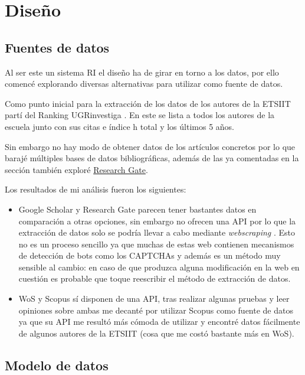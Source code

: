 \chapter{Diseño}


\section{Fuentes de datos}
Al ser este un sistema \acrshort{RI} el diseño ha de girar en torno a los datos, por ello comencé explorando diversas alternativas para utilizar como fuente de datos. 

Como punto inicial para la extracción de los datos de los autores de la \acrshort{ETSIIT} partí del Ranking UGRinvestiga \cite{Ranking_UGRInvestiga}. En este se lista a todos los autores de la escuela junto con sus citas e índice h total y los últimos 5 años.

Sin embargo no hay modo de obtener datos de los artículos concretos por lo que barajé múltiples bases de datos bibliográficas, además de las ya comentadas en la sección  también exploré \href{https://www.researchgate.net/}{Research Gate}.

Los resultados de mi análisis fueron los siguientes: 
\label{ls:dataSourceAnalisis}
\begin{itemize}
	
	\item Google Scholar y Research Gate parecen tener bastantes datos en comparación a otras opciones, sin embargo no ofrecen una \acrshort{API} por lo que la extracción de datos solo se podría llevar a cabo mediante \textit{\gls{webscraping}} . Esto no es un proceso sencillo ya que muchas de estas web contienen mecanismos de detección de bots como los CAPTCHAs \cite{scrapping_GS} y además es un método muy sensible al cambio: en caso de que produzca alguna modificación en la web en cuestión es probable que toque reescribir el método de extracción de datos.
	\item \acrshort{WoS} y Scopus sí disponen de una \acrshort{API}, tras realizar algunas pruebas y leer opiniones sobre ambas me decanté por utilizar Scopus como fuente de datos ya que su \acrshort{API} me resultó más cómoda de utilizar y encontré datos fácilmente de algunos autores de la \acrshort{ETSIIT} (cosa que me costó bastante más en \acrshort{WoS}).
\end{itemize}

\section{Modelo de datos}

